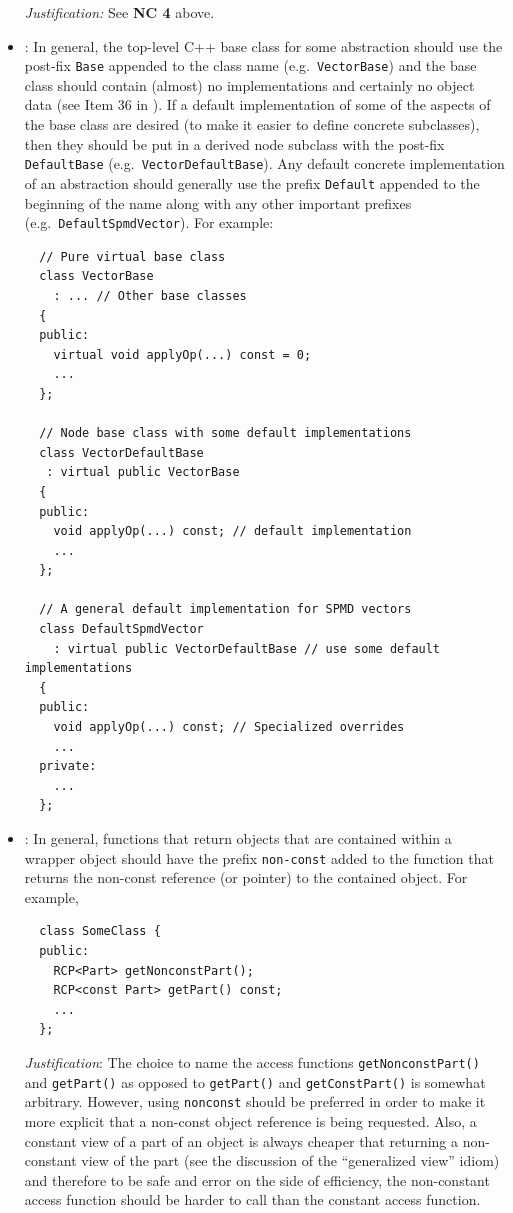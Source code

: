 \begin{itemize}
{}\textit{Justification:} See {}\textbf{NC 4} above.

{}\item\NCBaseDefaultClassNames: In general, the top-level C++ base class for some
abstraction should use the post-fix {}\texttt{Base} appended to the class name
(e.g.\ {}\texttt{Vector\-Base}) and the base class should contain (almost) no
implementations and certainly no object data (see Item 36 in
{}\cite{C++CodingStandards05}).  If a default implementation of some of the
aspects of the base class are desired (to make it easier to define concrete
subclasses), then they should be put in a derived node subclass with the
post-fix {}\texttt{DefaultBase} (e.g.\ {}\texttt{Vector\-Default\-Base}).  Any
default concrete implementation of an abstraction should generally use the
prefix {}\texttt{Default} appended to the beginning of the name along with any
other important prefixes (e.g.\ {}\texttt{DefaultSpmdVector}).  For example:

{\small\begin{verbatim}
  // Pure virtual base class 
  class VectorBase
    : ... // Other base classes
  {
  public:
    virtual void applyOp(...) const = 0;
    ...
  };

  // Node base class with some default implementations
  class VectorDefaultBase
   : virtual public VectorBase
  {
  public:
    void applyOp(...) const; // default implementation
    ...
  };

  // A general default implementation for SPMD vectors
  class DefaultSpmdVector
    : virtual public VectorDefaultBase // use some default implementations
  {
  public:
    void applyOp(...) const; // Specialized overrides
    ...
  private:
    ...
  };
\end{verbatim}}

{}\item\NCConstNonconstAccessFunctionName: In general, functions that return
objects that are contained within a wrapper object should have the prefix
{}\texttt{non-const} added to the function that returns the non-const reference
(or pointer) to the contained object.  For example,

{\small\begin{verbatim}
  class SomeClass {
  public:
    RCP<Part> getNonconstPart();
    RCP<const Part> getPart() const;
    ...
  };
\end{verbatim}}

{}\textit{Justification}: The choice to name the access functions
{}\texttt{getNonconstPart()} and {}\texttt{getPart()} as opposed to
{}\texttt{getPart()} and {}\texttt{getConstPart()} is somewhat arbitrary.
However, using {}\texttt{nonconst} should be preferred in order to make it
more explicit that a non-const object reference is being requested.  Also, a
constant view of a part of an object is always cheaper that returning a
non-constant view of the part (see the discussion of the ``generalized view''
idiom) and therefore to be safe and error on the side of efficiency, the
non-constant access function should be harder to call than the constant access
function.

\end{itemize}

